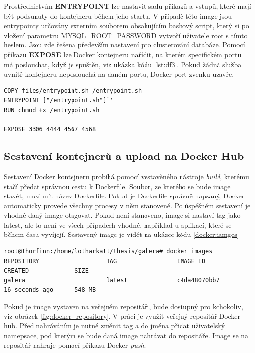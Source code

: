 Prostřednictvím \textbf{ENTRYPOINT} lze nastavit sadu příkazů a vstupů, které mají být podsunuty do kontejneru během jeho startu. V případě této image jsou entrypointy určovány externím souborem obsahujícím bashový script, který si po vložení parametru MYSQL\_ROOT\_PASSWORD vytvoří uživatele root s tímto heslem. Jsou zde řešena především nastavení pro clusterování databáze. Pomocí příkazu \textbf{EXPOSE} lze Docker kontejneru nařídit, na kterém specifickém portu má poslouchat, když je spuštěn, viz ukázka kódu \ref{lst:df3}. Pokud žádná služba uvnitř kontejneru neposlouchá na daném portu, Docker port zvenku uzavře.

\begin{lstlisting}[caption={Dockerfile, část 3},label= {lst:df3}]
COPY files/entrypoint.sh /entrypoint.sh
ENTRYPOINT ["/entrypoint.sh"]`'
RUN chmod +x /entrypoint.sh

EXPOSE 3306 4444 4567 4568

\end{lstlisting}


\subsection{Sestavení  kontejnerů a upload na Docker Hub}
Sestavení Docker kontejneru probíhá pomocí vestavěného nástroje \textit{build}, kterému stačí předat správnou cestu k Dockerfile. Soubor, ze kterého se bude image stavět, musí mít název Dockerfile. Pokud je Dockerfile správně napsaný, Docker automaticky provede všechny procesy v něm stanovené. Po úspěšném sestavení je vhodné daný image otagovat. Pokud není stanoveno, image si nastaví tag jako latest, ale to není ve všech případech vhodné, například u aplikací, které se během času vyvíjejí. Sestavený image je vidět na ukázce kódu \ref{docker:iamges}

\begin{lstlisting}[caption={Seznam neotagovaných Docker Image po vytvoření},label= {docker:images}]
root@Thorfinn:/home/lotharkatt/thesis/galera# docker images
REPOSITORY                   TAG                 IMAGE ID            CREATED             SIZE
galera                       latest              c4da48070bb7        16 seconds ago      548 MB
\end{lstlisting}

Pokud je image vystaven na veřejném repositáři, bude dostupný pro kohokoliv, viz obrázek \ref{fig:docker_repository}. V práci je využit veřejný repositář Docker hub. Před nahráváním je nutné změnit tag a do jména přidat uživatelský namepsace, pod kterým se bude daná image nahrávat do repositáře. Image se na repositář nahraje pomocí příkazu Docker \textit{push}.

